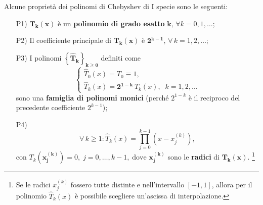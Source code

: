 Alcune proprietà dei polinomi di Chebyshev di I specie sono le seguenti:
\begin{itemize}
    \item [P1)] $\boldsymbol{T_k(x)}$ è un \textbf{polinomio di grado esatto} $\boldsymbol k,\,\forall k=0,1,\hdots$;
    \item[P2)]\footnotemark Il coefficiente principale di $\boldsymbol{T_k(x)}$ è $\boldsymbol{2^{k-1}},\,\forall\,k=1,2,\hdots$;
    \item[P3)]\footnotemark I polinomi $\boldsymbol{\left\{\widehat T_k\right\}_{k\geq 0}}$ definiti come
    \begin{equation*}
        \begin{cases}
            \widehat T_0(x)=T_0\equiv 1,\\
            \widehat T_k(x) =\boldsymbol{2^{1-k}}\, T_k(x),\;\; k=1,2,\hdots
        \end{cases}
    \end{equation*}
    sono una \textbf{famiglia di polinomi monici} (perché $2^{1-k}$ è il reciproco del precedente coefficiente $2^{k-1}$);
    \item[P4)] 
    \begin{equation*}
        \forall\, k\geq 1: \widehat T_k(x)=\prod_{j=0}^{k-1}\left(x-x_j^{(k)}\right),
    \end{equation*}
    con $T_k\left(\boldsymbol{x_j^{(k)}}\right)=0,\; j=0,\hdots,k-1,\;\text{dove } \boldsymbol{x_j^{(k)}}$ sono le \textbf{radici} di $\boldsymbol{T_k(x)}$. \footnote{Se le radici $x_j^{(k)}$ fossero tutte distinte e nell'intervallo $[-1,1]$, allora per il polinomio $\widehat T_k(x)$ è possibile scegliere un'ascissa di interpolazione.}
\end{itemize}

